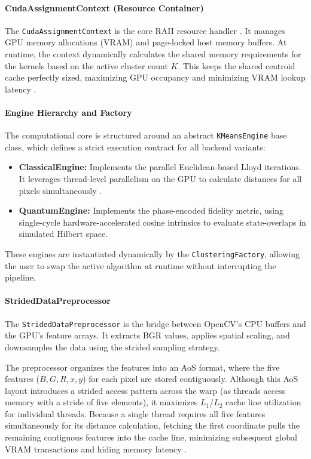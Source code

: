 \paragraph{CudaAssignmentContext (Resource Container)}
The \texttt{CudaAssignmentContext} is the core RAII resource handler \cite{stroustrup2022tour}. It manages GPU memory allocations (VRAM) and page-locked host memory buffers. At runtime, the context dynamically calculates the shared memory requirements for the kernels based on the active cluster count $K$. This keeps the shared centroid cache perfectly sized, maximizing GPU occupancy and minimizing VRAM lookup latency \cite{CudaGuide}.

\paragraph{Engine Hierarchy and Factory}
The computational core is structured around an abstract \texttt{KMeansEngine} base class, which defines a strict execution contract for all backend variants:
\begin{itemize}
    \item \textbf{ClassicalEngine:} Implements the parallel Euclidean-based Lloyd iterations. It leverages thread-level parallelism on the GPU to calculate distances for all pixels simultaneously \cite{farivar2008parallel}.
    \item \textbf{QuantumEngine:} Implements the phase-encoded fidelity metric, using single-cycle hardware-accelerated cosine intrinsics \cite{CudaGuide} to evaluate state-overlaps in simulated Hilbert space.
\end{itemize}
These engines are instantiated dynamically by the \texttt{ClusteringFactory}, allowing the user to swap the active algorithm at runtime without interrupting the pipeline.

\paragraph{StridedDataPreprocessor}
The \texttt{StridedDataPreprocessor} is the bridge between OpenCV's CPU buffers \cite{Bradski2000} and the GPU's feature arrays. It extracts BGR values, applies spatial scaling, and downsamples the data using the strided sampling strategy.

The preprocessor organizes the features into an AoS format, where the five features ($B, G, R, x, y$) for each pixel are stored contiguously. Although this AoS layout introduces a strided access pattern across the warp (as threads access memory with a stride of five elements), it maximizes $L_1$/$L_2$ cache line utilization for individual threads. Because a single thread requires all five features simultaneously for its distance calculation, fetching the first coordinate pulls the remaining contiguous features into the cache line, minimizing subsequent global VRAM transactions and hiding memory latency \cite{CudaGuide}.

